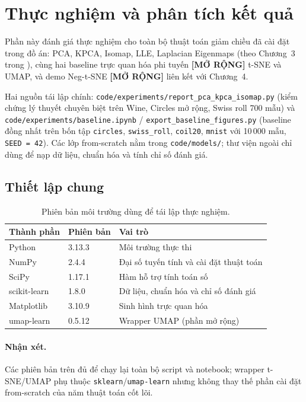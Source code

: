\section{Thực nghiệm và phân tích kết quả}
\label{sec:experiments}

\vietnameselst

Phần này đánh giá thực nghiệm cho toàn bộ thuật toán giảm chiều đã cài đặt trong đồ án:
PCA, KPCA, Isomap, LLE, Laplacian Eigenmaps (theo Chương~3 trong
\cite{mohri2018foundations}), cùng hai baseline trực quan hóa phi tuyến
\textbf{[MỞ RỘNG]} t-SNE và UMAP, và demo Neg-t-SNE \textbf{[MỞ RỘNG]} liên
kết với Chương~4.

Hai nguồn tái lập chính:
\texttt{code/experiments/report\_pca\_kpca\_isomap.py} (kiểm chứng lý thuyết
chuyên biệt trên Wine, Circles mở rộng, Swiss roll 700 mẫu) và
\texttt{code/experiments/baseline.ipynb} / \texttt{export\_baseline\_figures.py}
(baseline đồng nhất trên bốn tập \texttt{circles}, \texttt{swiss\_roll},
\texttt{coil20}, \texttt{mnist} với 10\,000 mẫu, \texttt{SEED = 42}). Các lớp
from-scratch nằm trong \texttt{code/models/}; thư viện ngoài chỉ dùng để nạp
dữ liệu, chuẩn hóa và tính chỉ số đánh giá.

\subsection{Thiết lập chung}

\begin{table}[H]
  \centering
  \caption{Phiên bản môi trường dùng để tái lập thực nghiệm.}
  \label{tab:experiment-environment}
  \begin{tabular}{p{}p{}p{}}
    \toprule
    Thành phần & Phiên bản & Vai trò \\
    \midrule
    Python & 3.13.3 & Môi trường thực thi \\
    NumPy & 2.4.4 & Đại số tuyến tính và cài đặt thuật toán \\
    SciPy & 1.17.1 & Hàm hỗ trợ tính toán số \\
    scikit-learn & 1.8.0 & Dữ liệu, chuẩn hóa và chỉ số đánh giá \\
    Matplotlib & 3.10.9 & Sinh hình trực quan hóa \\
    umap-learn & 0.5.12 & Wrapper UMAP (phần mở rộng) \\
    \bottomrule
  \end{tabular}
\end{table}

\paragraph{Nhận xét.}
Các phiên bản trên đủ để chạy lại toàn bộ script và notebook; wrapper t-SNE/UMAP
phụ thuộc \texttt{sklearn}/\texttt{umap-learn} nhưng không thay thế phần cài
đặt from-scratch của năm thuật toán cốt lõi.


